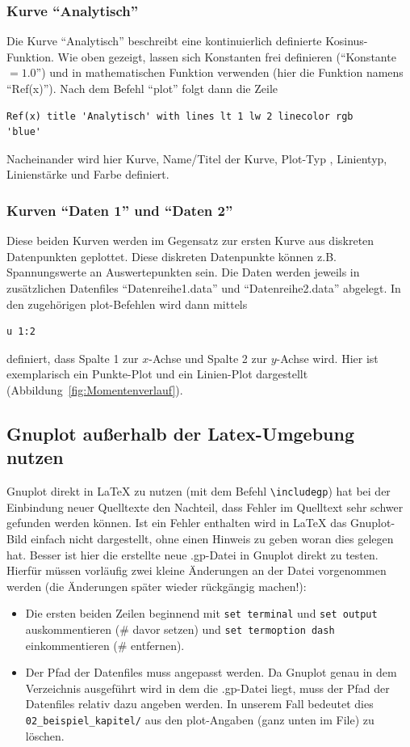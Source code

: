 \subsubsection{Kurve "`Analytisch"'}
Die Kurve "`Analytisch"' beschreibt eine kontinuierlich definierte
Kosinus-Funktion. Wie oben gezeigt, lassen sich Konstanten frei definieren
("`Konstante$=1.0$"') und in mathematischen Funktion verwenden (hier die
Funktion namens "`Ref(x)"'). Nach dem Befehl "`plot"' folgt dann die Zeile
\begin{verbatim}Ref(x) title 'Analytisch' with lines lt 1 lw 2 linecolor rgb
'blue' \end{verbatim}
Nacheinander wird hier Kurve, Name/Titel der Kurve, Plot-Typ , Linientyp,
Linienstärke und Farbe definiert.

\subsubsection{Kurven "`Daten 1"' und "`Daten 2"'}
Diese beiden Kurven werden im Gegensatz zur ersten Kurve aus diskreten
Datenpunkten geplottet. Diese diskreten Datenpunkte können z.B. Spannungswerte
an Auswertepunkten sein. Die Daten werden jeweils in zusätzlichen Datenfiles
"`Datenreihe1.data"' und "`Datenreihe2.data"' abgelegt. In den zugehörigen
plot-Befehlen wird dann mittels
\begin{verbatim}u 1:2\end{verbatim}
definiert, dass Spalte 1 zur $x$-Achse und Spalte 2 zur $y$-Achse wird. Hier ist
exemplarisch ein Punkte-Plot und ein Linien-Plot dargestellt (Abbildung~\ref{fig:Momentenverlauf}).



\subsection{Gnuplot außerhalb der Latex-Umgebung nutzen}

Gnuplot direkt in LaTeX zu nutzen (mit dem Befehl \verb+\includegp+) hat bei
der Einbindung neuer Quelltexte den Nachteil, dass Fehler im Quelltext sehr schwer gefunden werden können. Ist ein Fehler enthalten wird in LaTeX das
Gnuplot-Bild einfach nicht dargestellt, ohne einen Hinweis zu geben woran dies
gelegen hat. Besser ist hier die erstellte neue .gp-Datei in Gnuplot
direkt zu testen. Hierfür müssen vorläufig zwei kleine Änderungen an der Datei vorgenommen werden (die Änderungen später wieder rückgängig machen!):
\begin{itemize}
  \item Die ersten beiden Zeilen beginnend mit
  \verb+set terminal+ und \verb+set output+ auskommentieren (\# davor setzen)
  und \verb+set termoption dash+ einkommentieren (\# entfernen).
  \item Der Pfad der Datenfiles muss angepasst werden. Da Gnuplot genau in dem
  Verzeichnis ausgeführt wird in dem die .gp-Datei liegt, muss der Pfad der
  Datenfiles relativ dazu angeben werden. In unserem Fall bedeutet dies
  \verb+02_beispiel_kapitel/+ aus den plot-Angaben (ganz unten im File) zu
  löschen.
\end{itemize}

